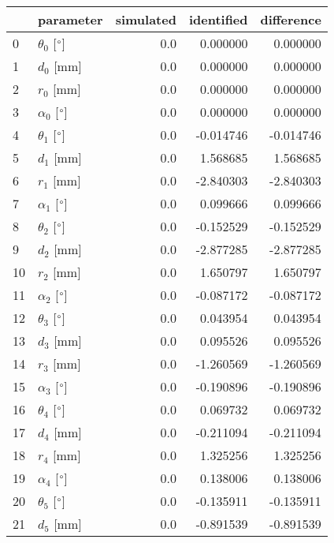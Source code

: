 \documentclass{standalone}%
\begin{document}
%
\normalsize%
\begin{tabular}{llrrr}
\toprule
{} &                 parameter & simulated & identified & difference \\
\midrule
0  &  $\theta_{0}$ [$\degree$] &       0.0 &   0.000000 &   0.000000 \\
1  &              $d_{0}$ [mm] &       0.0 &   0.000000 &   0.000000 \\
2  &              $r_{0}$ [mm] &       0.0 &   0.000000 &   0.000000 \\
3  &  $\alpha_{0}$ [$\degree$] &       0.0 &   0.000000 &   0.000000 \\
4  &  $\theta_{1}$ [$\degree$] &       0.0 &  -0.014746 &  -0.014746 \\
5  &              $d_{1}$ [mm] &       0.0 &   1.568685 &   1.568685 \\
6  &              $r_{1}$ [mm] &       0.0 &  -2.840303 &  -2.840303 \\
7  &  $\alpha_{1}$ [$\degree$] &       0.0 &   0.099666 &   0.099666 \\
8  &  $\theta_{2}$ [$\degree$] &       0.0 &  -0.152529 &  -0.152529 \\
9  &              $d_{2}$ [mm] &       0.0 &  -2.877285 &  -2.877285 \\
10 &              $r_{2}$ [mm] &       0.0 &   1.650797 &   1.650797 \\
11 &  $\alpha_{2}$ [$\degree$] &       0.0 &  -0.087172 &  -0.087172 \\
12 &  $\theta_{3}$ [$\degree$] &       0.0 &   0.043954 &   0.043954 \\
13 &              $d_{3}$ [mm] &       0.0 &   0.095526 &   0.095526 \\
14 &              $r_{3}$ [mm] &       0.0 &  -1.260569 &  -1.260569 \\
15 &  $\alpha_{3}$ [$\degree$] &       0.0 &  -0.190896 &  -0.190896 \\
16 &  $\theta_{4}$ [$\degree$] &       0.0 &   0.069732 &   0.069732 \\
17 &              $d_{4}$ [mm] &       0.0 &  -0.211094 &  -0.211094 \\
18 &              $r_{4}$ [mm] &       0.0 &   1.325256 &   1.325256 \\
19 &  $\alpha_{4}$ [$\degree$] &       0.0 &   0.138006 &   0.138006 \\
20 &  $\theta_{5}$ [$\degree$] &       0.0 &  -0.135911 &  -0.135911 \\
21 &              $d_{5}$ [mm] &       0.0 &  -0.891539 &  -0.891539 \\

\end{tabular}
\end{document}
